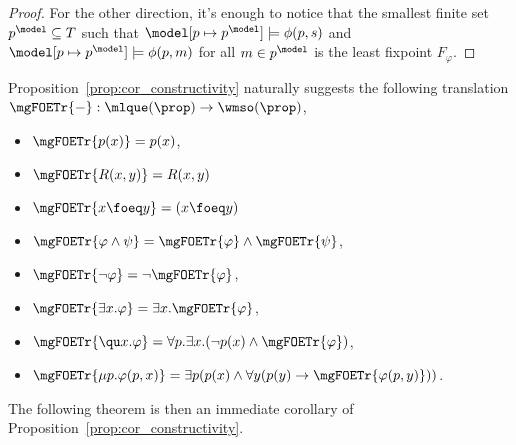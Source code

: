 \begin{proof}
For the other direction, it's enough to notice that the smallest finite set $p^\model \subseteq T$ such that $\model[p\mapsto p^\model] \models \phi(p,s)$ and $\model[p\mapsto p^\model] \models \phi(p,m)$ for all $m \in p^\model$ is the least fixpoint $F_\varphi$. %
 \end{proof}

\noindent Proposition~\ref{prop:cor_constructivity} naturally suggests the following translation $\mgFOETr{-}:\mlque(\prop)\to\wmso(\prop)$,

\begin{itemize}
	 pt
	\item $\mgFOETr{p(x)}=p(x)$,
	\item $\mgFOETr{R(x,y)}=R(x,y)$
	\item $\mgFOETr{x\foeq y}= (x \foeq y)$
	\item $\mgFOETr{\varphi \land \psi}=\mgFOETr{\varphi} \land \mgFOETr{\psi}$,
	\item $\mgFOETr{\lnot \varphi}= \lnot \mgFOETr{\varphi}$,
	\item $\mgFOETr{\exists x. \varphi}= \exists x. \mgFOETr{\varphi}$,
	\item $\mgFOETr{\qu x. \varphi}= \forall p.\exists x. (\lnot p(x) \land \mgFOETr{\varphi})$,
	\item $\mgFOETr{\mu p. \varphi(p,x)}= \exists p ( p(x) \land \forall y ( p(y) \to \mgFOETr{\varphi(p,y) }))$.
\end{itemize}
%
The following theorem %
is then an immediate corollary of Proposition~\ref{prop:cor_constructivity}.

